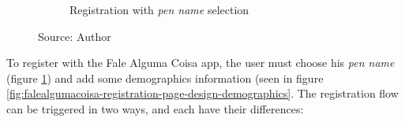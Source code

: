 \begin{figure}[h]
\begin{subfigure}{.5\textwidth}
      \caption{Registration with \textit{pen name} selection}
      \label{fig:falealgumacoisa-registration-page-design-pen-name}
    \end{subfigure}
    \caption*{Source: Author}
    \label{fig:falealgumacoisa-login-and-registration-page-design}
\end{figure}

To register with the Fale Alguma Coisa app, the user must choose his \textit{pen name} (figure \ref{fig:falealgumacoisa-registration-page-design-pen-name}) and add some demographics information (seen in figure \ref{fig:falealgumacoisa-registration-page-design-demographics}. The registration flow can be triggered in two ways, and each have their differences:

